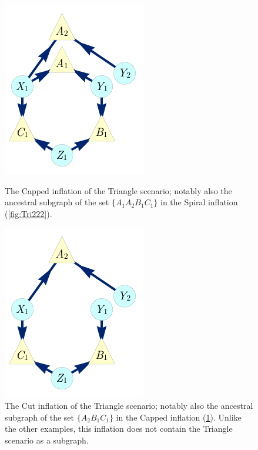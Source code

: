 \begin{figure}[hb]
\centering
\begin{minipage}[t]{0.3\linewidth}
\centering
\includegraphics[scale=1]{broadcastingexamplenohighlightALT.pdf}
\caption{The Capped inflation of the Triangle scenario; notably also the ancestral subgraph of the set $\{ A_1 A_2 B_1 C_1\}$ in the Spiral inflation (\cref{fig:Tri222}).}
\label{fig:simpleinflation}
\end{minipage}\hfill
\begin{minipage}[t]{0.275\linewidth}
\centering
\includegraphics[scale=1]{nobroadcastingexamplenohighlightALT.pdf}
\caption{The Cut inflation of the Triangle scenario; notably also the ancestral subgraph of the set $\{ A_2 B_1 C_1\}$ in the Capped inflation (\cref{fig:simpleinflation}). Unlike the other examples, this inflation does not contain the Triangle scenario as a subgraph. 
}\color{black}

\end{minipage}
\end{figure}
